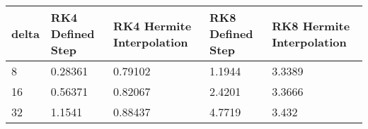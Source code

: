 \begin{tabular}{lllll}
delta & RK4 Defined Step & RK4 Hermite Interpolation & RK8 Defined Step & RK8 Hermite Interpolation \\ 
\hline 
8 & 0.28361 & 0.79102 & 1.1944 & 3.3389 \\ 
16 & 0.56371 & 0.82067 & 2.4201 & 3.3666 \\ 
32 & 1.1541 & 0.88437 & 4.7719 & 3.432 \\ 
\hline 
\end{tabular}